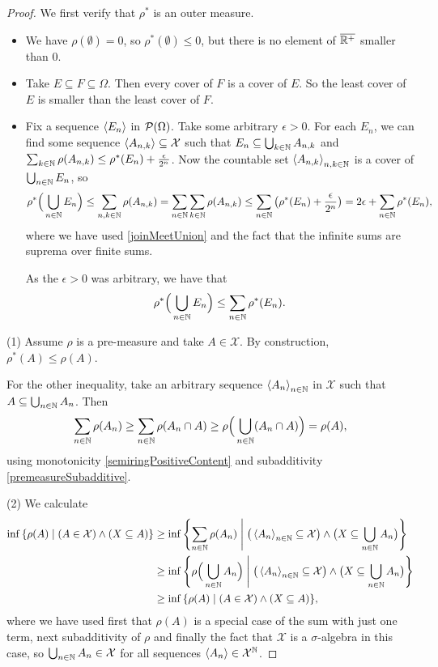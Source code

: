 \begin{proof}
We first verify that $\rho^*$ is an outer measure.
\begin{itemize}
\item We have $\rho(\emptyset) = 0$, so $\rho^*(\emptyset)\leq 0$, but there is no element of $\overline{\mathbb{R}^+}$ smaller than $0$.
\item Take $E\subseteq F\subseteq \Omega$. Then every cover of $F$ is a cover of $E$. So the least cover of $E$ is smaller than the least cover of $F$.
\item Fix a sequence $\left\langle E_n \right\rangle$ in $\operatorname{\mathcal{P}}(\Omega)$. Take some arbitrary $\epsilon > 0$. For each $E_n$, we can find some sequence $\left\langle A_{n,k} \right\rangle\subseteq \mathcal{X}$ such that $E_n\subseteq \bigcup_{k\in\mathbb{N}}A_{n,k}$ and $\sum_{k\in\mathbb{N}}\rho(A_{n,k}) \leq \rho^*(E_n) + \frac{\epsilon}{2^n}$.
Now the countable set $\left\langle A_{n,k} \right\rangle_{n,k\in \mathbb{N}}$ is a cover of $\bigcup_{n\in\mathbb{N}}E_n$, so
\[ \rho^*\Big(\bigcup_{n\in\mathbb{N}}E_n\Big) \leq \sum_{n,k\in\mathbb{N}}\rho(A_{n,k}) = \sum_{n\in\mathbb{N}}\sum_{k\in\mathbb{N}}\rho(A_{n,k}) \leq \sum_{n\in\mathbb{N}}\big(\rho^*(E_n)+ \frac{\epsilon}{2^n}\big) = 2\epsilon + \sum_{n\in\mathbb{N}}\rho^*(E_n), \]
where we have used \ref{joinMeetUnion} and the fact that the infinite sums are suprema over finite sums.

As the $\epsilon> 0$ was arbitrary, we have that
\[ \rho^*\Big(\bigcup_{n\in\mathbb{N}}E_n\Big) \leq \sum_{n\in\mathbb{N}}\rho^*(E_n). \]
\end{itemize}


(1) Assume $\rho$ is a pre-measure and take $A\in\mathcal{X}$. By construction, $\rho^*(A) \leq \rho(A)$. 

For the other inequality, take an arbitrary sequence $\left\langle A_n \right\rangle_{n\in\mathbb{N}}$ in $\mathcal{X}$ such that $A \subseteq \bigcup_{n\in\mathbb{N}}A_n$. Then
\[ \sum_{n\in\mathbb{N}}\rho(A_n) \geq \sum_{n\in\mathbb{N}}\rho(A_n\cap A) \geq \rho\Big(\bigcup_{n\in\mathbb{N}}(A_n\cap A)\Big) = \rho(A), \]
using monotonicity \ref{semiringPositiveContent} and subadditivity \ref{premeasureSubadditive}.

(2) We calculate
\begin{align*}
\inf\setbuilder{\rho(A)}{(A\in \mathcal{X}) \land (X\subseteq A)} &\geq \inf\setbuilder{\sum_{n\in\N}\rho(A_n)}{\big(\seq{A_n}_{n\in\N}\subseteq \mathcal{X}\big) \land \big(X\subseteq \bigcup_{n\in\N}A_n\big)} \\
&\geq \inf\setbuilder{\rho\Big(\bigcup_{n\in\N}A_n\Big)}{\big(\seq{A_n}_{n\in\N}\subseteq \mathcal{X}\big) \land \big(X\subseteq \bigcup_{n\in\N}A_n\big)} \\
&\geq \inf\setbuilder{\rho(A)}{(A\in \mathcal{X}) \land (X\subseteq A)},
\end{align*}
where we have used first that $\rho(A)$ is a special case of the sum with just one term, next subadditivity of $\rho$ and finally the fact that $\mathcal{X}$ is a $\sigma$-algebra in this case, so $\bigcup_{n\in \mathbb{N}}A_n\in \mathcal{X}$ for all sequences $\left\langle A_n \right\rangle\in \mathcal{X}^{\mathbb{N}}$.
\end{proof}

